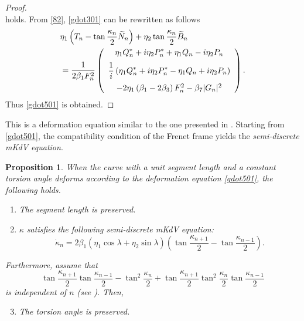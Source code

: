 \documentclass[10pt,leqno]{amsart}
\newtheorem{prop}[theorem]{Proposition}
\numberwithin{equation}{section}
\begin{document}
\begin{proof}
\begin{equation}
\end{equation}
holds. From \eqref{82}, \eqref{gdot301} can be rewritten as follows
\begin{equation}\label{gdot401}
\begin{split}
&\eta_{1}\left(T_{n}-\tan\frac{\kappa_{n}}{2}\widetilde{N}_{n}\right)+\eta_{2}\tan\frac{\kappa_{n}}{2}\widetilde{B}_{n}\\
&=\frac{1}{2\beta_{1} F_{n}^{2}}\left(
    \begin{array}{c}
    \vspace{2mm}
\displaystyle \eta_{1}Q_{n}^{*}+i\eta_{2}P_{n}^{*}+\eta_{1}Q_{n}-i\eta_{2}P_{n}\\
\vspace{2mm}
\displaystyle\frac{1}{i}\left(\eta_{1}Q_{n}^{*}+i\eta_{2}P_{n}^{*}-\eta_{1}Q_{n}+i\eta_{2}P_{n}\right)\\
-2\eta_{1}\left(\beta_{1}-2\beta_{3}\right)F_{n}^{2}-\beta_{7}|G_{n}|^{2}
    \end{array}
  \right).
  \end{split}
\end{equation}
Thus \eqref{gdot501} is obtained. 
\end{proof}
This is a deformation equation similar to the one presented in \cite{IKMO:DmKdVsG}. 
Starting from \eqref{gdot501}, the compatibility condition of the Frenet frame yields the \emph{semi-discrete mKdV equation}.
\begin{prop}\label{prop:dotgamma}
When the curve with a unit segment length and a constant torsion angle deforms according to the deformation equation \eqref{gdot501}, the following holds.
\begin{enumerate}
    \item The segment length is preserved.
    \item $\kappa$ satisfies the following semi-discrete mKdV equation: \begin{equation}
\dot{\kappa}_{n}=2\beta_{1}\left(\eta_{1}\cos\lambda+\eta_{2}\sin\lambda\right)\left(\tan\frac{\kappa_{n+1}}{2}-\tan\frac{\kappa_{n-1}}{2}\right).\label{anothermkdv7}
\end{equation}
\end{enumerate}
Furthermore, assume that
\begin{equation}\label{eq:kappa_conserved_quantity}
\tan\frac{\kappa_{n+1}}{2}\tan\frac{\kappa_{n-1}}{2}
-\tan^2\frac{\kappa_n}{2}
+\tan\frac{\kappa_{n+1}}{2}\tan^2\frac{\kappa_n}{2}\tan\frac{\kappa_{n-1}}{2}
\end{equation}
is independent of $n$ (see ).
Then,
\begin{enumerate}
\setcounter{enumi}{2}
    \item The torsion angle is preserved.
\end{enumerate}
\end{prop}
\end{document}
